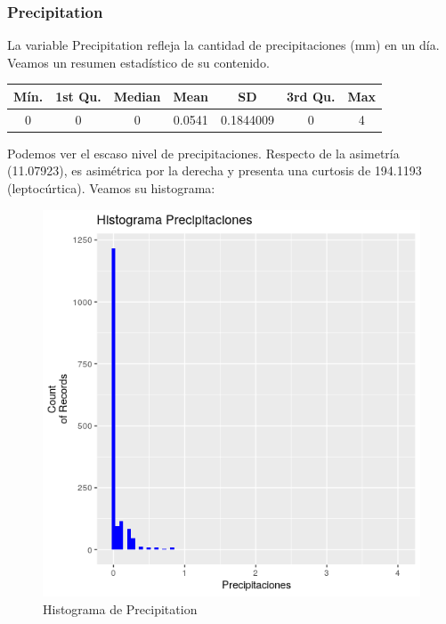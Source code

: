 \subsubsection{Precipitation}

La variable Precipitation refleja la cantidad de precipitaciones (mm) en un día. Veamos un resumen estadístico de su contenido.

\begin{table}[H]
	\centering
	\begin{tabular}{|c|c|c|c|c|c|c|}
		\hline
		Mín. & 1st Qu. & Median & Mean   & SD        & 3rd Qu. & Max \\ \hline
		0    & 0       & 0      & 0.0541 & 0.1844009 & 0       & 4   \\ \hline
	\end{tabular}
\end{table}

Podemos ver el escaso nivel de precipitaciones. Respecto de la asimetría (11.07923), es asimétrica por la derecha y presenta una curtosis de 194.1193 (leptocúrtica). Veamos su histograma:


 
\begin{figure}[H] %
	\centering
	\includegraphics[scale=0.7]{hist-pre.png}  %
	\caption{Histograma de Precipitation} 
	\label{fig:hist-pre}
\end{figure}

